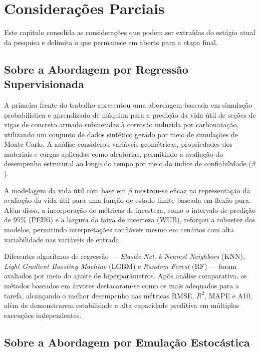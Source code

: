 \chapter{Considerações Parciais} \label{cap:consideracoes}

Este capítulo consolida as considerações que podem ser extraídas do estágio atual da pesquisa e delimita o que permanece em aberto para a etapa final.

\section{Sobre a Abordagem por Regressão Supervisionada}

A primeira frente do trabalho apresentou uma abordagem baseada em simulação probabilística e aprendizado de máquina para a predição da vida útil de seções de vigas de concreto armado submetidas à corrosão induzida por carbonatação, utilizando um conjunto de dados sintético gerado por meio de simulações de Monte Carlo. A análise considerou variáveis geométricas, propriedades dos materiais e cargas aplicadas como aleatórias, permitindo a avaliação do desempenho estrutural ao longo do tempo por meio do índice de confiabilidade ($\beta$).

A modelagem da vida útil com base em $\beta$ mostrou-se eficaz na representação da avaliação da vida útil para uma função de estado limite baseada em flexão pura. Além disso, a incorporação de métricas de incerteza, como o intervalo de predição de 95\% (PEI95) e a largura da faixa de incerteza (WUB), reforçou a robustez dos modelos, permitindo interpretações confiáveis mesmo em cenários com alta variabilidade nas variáveis de entrada.

Diferentes algoritmos de regressão --- \textit{Elastic Net}, \textit{k-Nearest Neighbors} (KNN), \textit{Light Gradient Boosting Machine} (LGBM) e \textit{Random Forest} (RF) --- foram avaliados por meio do ajuste de hiperparâmetros. Após análise comparativa, os métodos baseados em árvores destacaram-se como os mais adequados para a tarefa, alcançando o melhor desempenho nas métricas RMSE, $R^2$, MAPE e A10, além de demonstrarem estabilidade e alta capacidade preditiva em múltiplas execuções independentes.

\section{Sobre a Abordagem por Emulação Estocástica}

